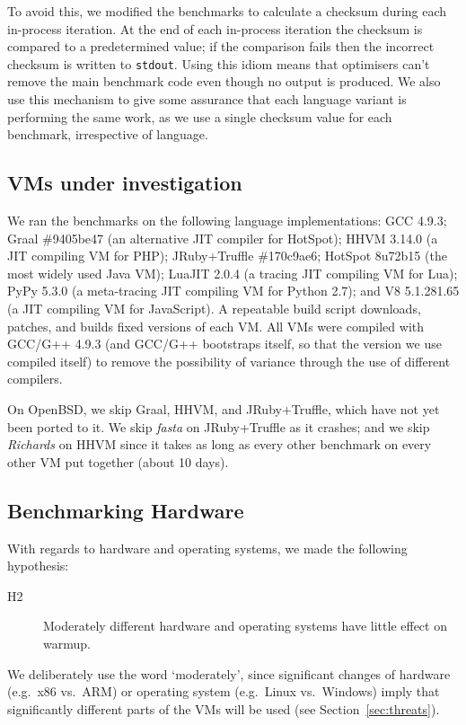 \documentclass[preprint,numbers,10pt]{sigplanconf}
\newcommand{\hyptwo}{H2\xspace}
\newcommand{\richards}{\emph{Richards}\xspace}
\newcommand{\fasta}{\emph{fasta}\xspace}
\begin{document}
To avoid this, we modified the benchmarks to calculate a checksum
during each in-process iteration. At the end of each in-process iteration
the checksum is compared to a predetermined value; if the comparison fails then
the incorrect checksum is written to \texttt{stdout}. Using this idiom
means that optimisers can't remove the main benchmark code even though
no output is produced. We also use this mechanism to give some assurance
that each language variant is performing the same work, as we use a single
checksum value for each benchmark, irrespective of language.


\subsection{VMs under investigation}

We ran the benchmarks on the following language implementations: GCC 4.9.3;
Graal \#9405be47 (an alternative JIT compiler for HotSpot); HHVM 3.14.0 (a JIT
compiling VM for PHP); JRuby+Truffle \#170c9ae6; HotSpot 8u72b15 (the most widely used Java
VM); LuaJIT 2.0.4 (a tracing JIT compiling VM for Lua); PyPy 5.3.0 (a
meta-tracing JIT compiling VM for Python 2.7); and V8 5.1.281.65 (a JIT
compiling VM for JavaScript). A repeatable build script downloads, patches,
and builds fixed versions of each VM. All VMs were compiled with GCC/G++ 4.9.3
(and GCC/G++ bootstraps itself, so that the version we use compiled itself)
to remove the possibility of variance through the use of different compilers.

\label{openbsd porting} On OpenBSD, we skip Graal, HHVM, and JRuby+Truffle, which have not yet been
ported to it. We skip \fasta on JRuby+Truffle as it crashes;
and we skip \richards on HHVM since it takes as long as every other benchmark
on every other VM put together (about 10 days).


\subsection{Benchmarking Hardware}

With regards to hardware and operating systems, we made the
following hypothesis:
\begin{description}
  \item[\hyptwo] Moderately different hardware and operating systems have little effect on warmup.
\end{description}
We deliberately use the word `moderately', since significant changes of hardware
(e.g.~x86 vs.~ARM) or operating system (e.g.~Linux vs.~Windows) imply that
significantly different parts of the VMs will be used (see Section~\ref{sec:threats}).
\end{document}
